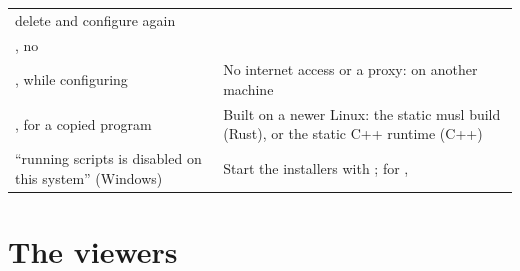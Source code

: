 \begin{xltabular}{\linewidth}{@{}P{5.8cm}L@{}}
  delete  and configure again \\
, no  &
   \\
,  while configuring & No internet access or a
  proxy:  on another machine \\
,  for a copied program
  & Built on a newer Linux: the static musl build (Rust), or the static C++ runtime (C++) \\
``running scripts is disabled on this system'' (Windows) & Start the installers with
  ; for ,
   \\
\end{xltabular}

\section{The viewers}
\label{sec:troubleshooting-viewers}

